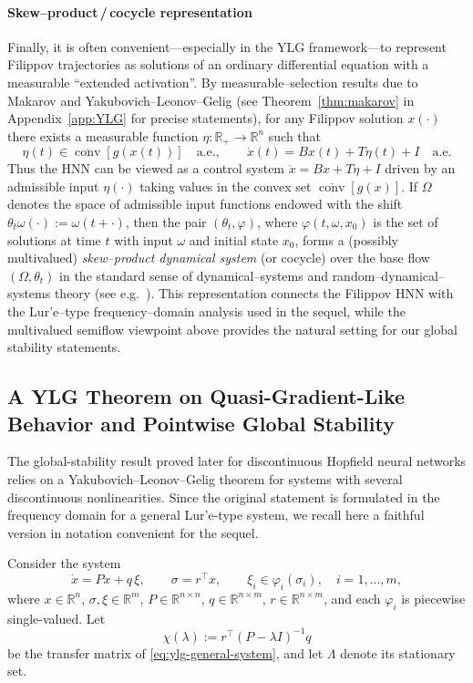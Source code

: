 \documentclass[journal]{IEEEtran}
\begin{document}
\smallskip
\paragraph*{Skew–product\,/\,cocycle representation}
Finally, it is often convenient—especially in the YLG framework—to
represent Filippov trajectories as solutions of an ordinary
differential equation with a measurable ``extended activation''.
By measurable–selection results due to Makarov and
Yakubovich–Leonov–Gelig (see Theorem~\ref{thm:makarov} in Appendix~\ref{app:YLG} 
for precise statements), for any Filippov solution $x(\cdot)$ there exists a
measurable function
$\eta:\mathbb{R}_+\to\mathbb{R}^n$ such that
\[
   \eta(t) \in \overline{\operatorname{conv}}[g(x(t))] \quad\text{a.e.},
   \qquad
   \dot x(t) = Bx(t) + T\eta(t) + I \quad\text{a.e.}
\]
Thus the HNN can be viewed as a control system
\(
   \dot x = Bx + T\eta + I
\)
driven by an admissible input $\eta(\cdot)$ taking values in the convex
set $\overline{\operatorname{conv}}[g(x)]$.  If $\Omega$ denotes the
space of admissible input functions endowed with the shift
$\theta_t\omega(\cdot):=\omega(t+\cdot)$, then the pair
$(\theta_t,\varphi)$, where $\varphi(t,\omega,x_0)$ is the set of
solutions at time $t$ with input $\omega$ and initial state $x_0$, forms
a (possibly multivalued) \emph{skew–product dynamical system} (or
cocycle) over the base flow $(\Omega,\theta_t)$ in the standard sense
of dynamical–systems and random–dynamical–systems theory (see e.g.~\cite{}).
This representation connects the Filippov HNN with the Lur'e–type
frequency–domain analysis used in the sequel, while the multivalued
semiflow viewpoint above provides the natural setting for our global
stability statements.

\subsection{A YLG Theorem on Quasi-Gradient-Like Behavior and Pointwise Global Stability}
\label{sec:ylg-theorem}

The global-stability result proved later for discontinuous Hopfield neural
networks relies on a Yakubovich--Leonov--Gelig theorem for systems with several
discontinuous nonlinearities. Since the original statement is formulated in the
frequency domain for a general Lur'e-type system, we recall here a faithful
version in notation convenient for the sequel.

Consider the system
\begin{equation}
  \dot{x} = P x + q\,\xi, 
  \qquad
  \sigma = r^{\top}x,
  \qquad
  \xi_i \in \varphi_i(\sigma_i),
  \quad i=1,\dots,m,
  \label{eq:ylg-general-system}
\end{equation}
where \(x\in\mathbb{R}^n\), \(\sigma,\xi\in\mathbb{R}^m\),
\(P\in\mathbb{R}^{n\times n}\), \(q\in\mathbb{R}^{n\times m}\),
\(r\in\mathbb{R}^{n\times m}\), and each \(\varphi_i\) is piecewise
single-valued. Let
\begin{equation}
  \chi(\lambda) := r^{\top}(P-\lambda I)^{-1}q
  \label{eq:ylg-transfer}
\end{equation}
be the transfer matrix of \eqref{eq:ylg-general-system}, and let
\(\Lambda\) denote its stationary set.
\end{document}
